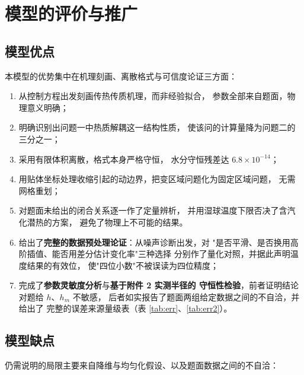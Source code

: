 \documentclass[12pt,a4paper,fontset=none]{ctexart}
\begin{document}
\section{模型的评价与推广}

\subsection{模型优点}

本模型的优势集中在机理刻画、离散格式与可信度论证三方面：

\begin{enumerate}
  \item 从控制方程出发刻画传热传质机理，而非经验拟合，
        参数全部来自题面，物理意义明确；
  \item 明确识别出问题一中热质解耦这一结构性质，
        使该问的计算量降为问题二的三分之一；
  \item 采用有限体积离散，格式本身严格守恒，
        水分守恒残差达 $6.8\times10^{-14}$；
  \item 用贴体坐标处理收缩引起的动边界，把变区域问题化为固定区域问题，
        无需网格重划；
  \item 对题面未给出的闭合关系逐一作了定量辨析，
        并用湿球温度下限否决了含汽化潜热的方案，
        避免了物理上不可能的结果。
  \item 给出了\textbf{完整的数据预处理论证}：从噪声诊断出发，对
        "是否平滑、是否换用高阶插值、能否用差分估计变化率"三种选择
        分别作了量化对照，并据此声明温度结果的有效位，
        使"四位小数"不被误读为四位精度；
  \item 完成了\textbf{参数灵敏度分析}与\textbf{基于附件 2 实测半径的
        守恒性检验}，前者证明结论对题给 $h$、$h_m$ 不敏感，
        后者如实报告了题面两组给定数据之间的不自洽，并给出了
        完整的误差来源量级表（表 \ref{tab:err}、\ref{tab:err2}）。
\end{enumerate}

\subsection{模型缺点}

仍需说明的局限主要来自降维与均匀化假设、以及题面数据之间的不自洽：
\end{document}
